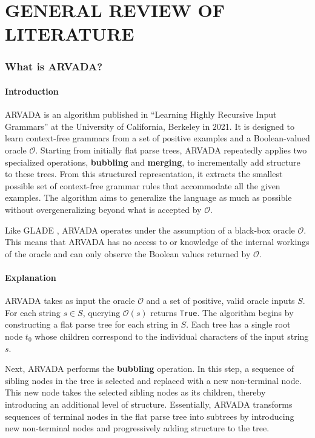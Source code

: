 \chapter{GENERAL REVIEW OF LITERATURE}

\subsection{What is ARVADA?}

\subsubsection{Introduction}

ARVADA is an algorithm published in \enquote{Learning Highly Recursive Input Grammars} \cite{kulkarniLearningHighlyRecursive2021} at the University of California, Berkeley in 2021. It is designed to learn context-free grammars from a set of positive examples and a Boolean-valued oracle $\mathcal{O}$. Starting from initially flat parse trees, ARVADA repeatedly applies two specialized operations, \textbf{bubbling} and \textbf{merging}, to incrementally add structure to these trees. From this structured representation, it extracts the smallest possible set of context-free grammar rules that accommodate all the given examples. The algorithm aims to generalize the language as much as possible without overgeneralizing beyond what is accepted by $\mathcal{O}$.

\vspace{\baselineskip}
Like GLADE \cite{bastaniSynthesizingProgramInput}, ARVADA operates under the assumption of a black-box oracle $\mathcal{O}$. This means that ARVADA has no access to or knowledge of the internal workings of the oracle and can only observe the Boolean values returned by $\mathcal{O}$.

\subsubsection{Explanation}

ARVADA takes as input the oracle $\mathcal{O}$ and a set of positive, valid oracle inputs $S$. For each string $s \in S$, querying $\mathcal{O}(s)$ returns \verb|True|. The algorithm begins by constructing a flat parse tree for each string in $S$. Each tree has a single root node $t_0$ whose children correspond to the individual characters of the input string $s$.

\vspace{\baselineskip}
Next, ARVADA performs the \textbf{bubbling} operation. In this step, a sequence of sibling nodes in the tree is selected and replaced with a new non-terminal node. This new node takes the selected sibling nodes as its children, thereby introducing an additional level of structure. Essentially, ARVADA transforms sequences of terminal nodes in the flat parse tree into subtrees by introducing new non-terminal nodes and progressively adding structure to the tree.

